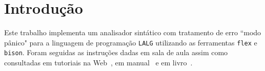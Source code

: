 \section{Introdução \label{sec:introducao}}

Este trabalho implementa um analisador sintático com tratamento de erro ``modo pânico" para a linguagem de programação \texttt{LALG} utilizando as ferramentas \texttt{flex} e \texttt{bison}. Foram seguidas as instruções dadas em sala de aula assim como consultadas em tutoriais na Web~\cite{bib:youtube}, em manual~\cite{bib:manual} e em livro~\cite{bib:livro}.
